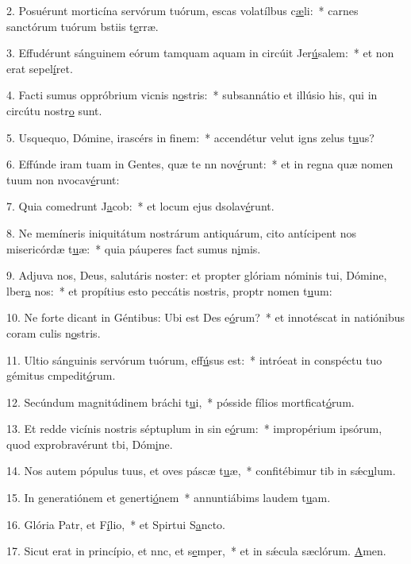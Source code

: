 2. Posuérunt morticína servórum tuórum, escas volatílbus c\uline{æ}li:~* carnes sanctórum tuórum bstiis t\uline{e}rræ.\par 
3. Effudérunt sánguinem eórum tamquam aquam in circúit Jer\uline{ú}salem:~* et non erat  sepel\uline{í}ret.\par 
4. Facti sumus oppróbrium vicnis n\uline{o}stris:~* subsannátio et illúsio his, qui in circútu nostr\uline{o} sunt.\par 
5. Usquequo, Dómine, irascérs in f\uline{i}nem:~* accendétur velut igns zelus t\uline{u}us?\par 
6. Effúnde iram tuam in Gentes, quæ te nn nov\uline{é}runt:~* et in regna quæ nomen tuum non nvocav\uline{é}runt:\par 
7. Quia comedrunt J\uline{a}cob:~* et locum ejus dsolav\uline{é}runt.\par 
8. Ne memíneris iniquitátum nostrárum antiquárum, cito antícipent nos misericórdæ t\uline{u}æ:~* quia páuperes fact sumus n\uline{i}mis.\par 
9. Adjuva nos, Deus, salutáris noster: et propter glóriam nóminis tui, Dómine, lber\uline{a} nos:~* et propítius esto peccátis nostris, proptr nomen t\uline{u}um:\par 
10. Ne forte dicant in Géntibus: Ubi est Des e\uline{ó}rum?~* et innotéscat in natiónibus coram culis n\uline{o}stris.\par 
11. Ultio sánguinis servórum tuórum,  eff\uline{ú}sus est:~* intróeat in conspéctu tuo gémitus cmpedit\uline{ó}rum.\par 
12. Secúndum magnitúdinem bráchi t\uline{u}i,~* pósside fílios mortficat\uline{ó}rum.\par 
13. Et redde vicínis nostris séptuplum in sin e\uline{ó}rum:~* impropérium ipsórum, quod exprobravérunt tbi, Dóm\uline{i}ne.\par 
14. Nos autem pópulus tuus, et oves páscæ t\uline{u}æ,~* confitébimur tib in sǽc\uline{u}lum.\par 
15. In generatiónem et generti\uline{ó}nem~* annuntiábims laudem t\uline{u}am.\par 
16. Glória Patr, et F\uline{í}lio,~* et Spirtui S\uline{a}ncto.\par 
17. Sicut erat in princípio, et nnc, et s\uline{e}mper,~* et in sǽcula sæclórum. \uline{A}men.\par 

